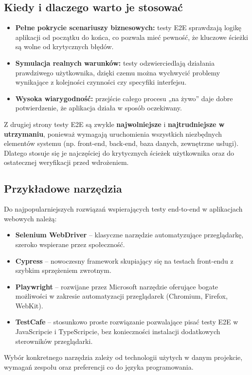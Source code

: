 \documentclass[12pt]{report}
\begin{document}
\subsection*{Kiedy i dlaczego warto je stosować}
\begin{itemize}
    \item \textbf{Pełne pokrycie scenariuszy biznesowych:} testy E2E sprawdzają logikę aplikacji od początku do końca, co pozwala mieć pewność, że kluczowe ścieżki są wolne od krytycznych błędów.
    \item \textbf{Symulacja realnych warunków:} testy odzwierciedlają działania prawdziwego użytkownika, dzięki czemu można wychwycić problemy wynikające z kolejności czynności czy specyfiki interfejsu.
    \item \textbf{Wysoka wiarygodność:} przejście całego procesu „na żywo” daje dobre potwierdzenie, że aplikacja działa w sposób oczekiwany.
\end{itemize}
Z drugiej strony testy E2E są zwykle \textbf{najwolniejsze} i \textbf{najtrudniejsze w utrzymaniu}, ponieważ wymagają uruchomienia wszystkich niezbędnych elementów systemu (np. front-end, back-end, baza danych, zewnętrzne usługi). Dlatego stosuje się je najczęściej do krytycznych ścieżek użytkownika oraz do ostatecznej weryfikacji przed wdrożeniem.

\subsection*{Przykładowe narzędzia}
Do najpopularniejszych rozwiązań wspierających testy end-to-end w aplikacjach webowych należą:
\begin{itemize}
    \item \textbf{Selenium WebDriver} – klasyczne narzędzie automatyzujące przeglądarkę, szeroko wspierane przez społeczność.
    \item \textbf{Cypress} – nowoczesny framework skupiający się na testach front-endu z szybkim sprzężeniem zwrotnym.
    \item \textbf{Playwright} – rozwijane przez Microsoft narzędzie oferujące bogate możliwości w zakresie automatyzacji przeglądarek (Chromium, Firefox, WebKit).
    \item \textbf{TestCafe} – stosunkowo proste rozwiązanie pozwalające pisać testy E2E w JavaScripcie i TypeScripcie, bez konieczności instalacji dodatkowych sterowników przeglądarki.
\end{itemize}
Wybór konkretnego narzędzia zależy od technologii użytych w danym projekcie, wymagań zespołu oraz preferencji co do języka programowania. 
\end{document}
